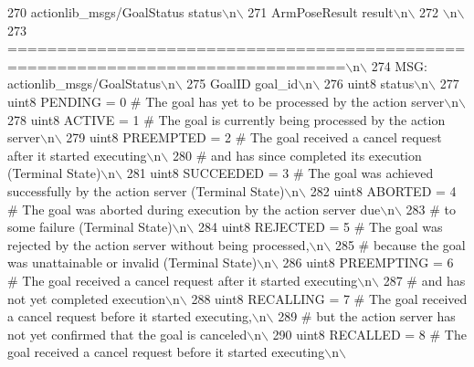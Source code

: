 \begin{DoxyCode}
270 \textcolor{stringliteral}{actionlib\_msgs/GoalStatus status\(\backslash\)n\(\backslash\)}
271 \textcolor{stringliteral}{ArmPoseResult result\(\backslash\)n\(\backslash\)}
272 \textcolor{stringliteral}{\(\backslash\)n\(\backslash\)}
273 \textcolor{stringliteral}{================================================================================\(\backslash\)n\(\backslash\)}
274 \textcolor{stringliteral}{MSG: actionlib\_msgs/GoalStatus\(\backslash\)n\(\backslash\)}
275 \textcolor{stringliteral}{GoalID goal\_id\(\backslash\)n\(\backslash\)}
276 \textcolor{stringliteral}{uint8 status\(\backslash\)n\(\backslash\)}
277 \textcolor{stringliteral}{uint8 PENDING         = 0   # The goal has yet to be processed by the action server\(\backslash\)n\(\backslash\)}
278 \textcolor{stringliteral}{uint8 ACTIVE          = 1   # The goal is currently being processed by the action server\(\backslash\)n\(\backslash\)}
279 \textcolor{stringliteral}{uint8 PREEMPTED       = 2   # The goal received a cancel request after it started executing\(\backslash\)n\(\backslash\)}
280 \textcolor{stringliteral}{                            #   and has since completed its execution (Terminal State)\(\backslash\)n\(\backslash\)}
281 \textcolor{stringliteral}{uint8 SUCCEEDED       = 3   # The goal was achieved successfully by the action server (Terminal State)\(\backslash\)n\(\backslash\)}
282 \textcolor{stringliteral}{uint8 ABORTED         = 4   # The goal was aborted during execution by the action server due\(\backslash\)n\(\backslash\)}
283 \textcolor{stringliteral}{                            #    to some failure (Terminal State)\(\backslash\)n\(\backslash\)}
284 \textcolor{stringliteral}{uint8 REJECTED        = 5   # The goal was rejected by the action server without being processed,\(\backslash\)n\(\backslash\)}
285 \textcolor{stringliteral}{                            #    because the goal was unattainable or invalid (Terminal State)\(\backslash\)n\(\backslash\)}
286 \textcolor{stringliteral}{uint8 PREEMPTING      = 6   # The goal received a cancel request after it started executing\(\backslash\)n\(\backslash\)}
287 \textcolor{stringliteral}{                            #    and has not yet completed execution\(\backslash\)n\(\backslash\)}
288 \textcolor{stringliteral}{uint8 RECALLING       = 7   # The goal received a cancel request before it started executing,\(\backslash\)n\(\backslash\)}
289 \textcolor{stringliteral}{                            #    but the action server has not yet confirmed that the goal is canceled\(\backslash\)n\(\backslash\)}
290 \textcolor{stringliteral}{uint8 RECALLED        = 8   # The goal received a cancel request before it started executing\(\backslash\)n\(\backslash\)}

\end{DoxyCode}
